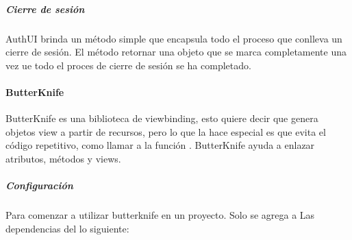 \subparagraph{Cierre de sesión}
\label{\detokenize{dev_docs:cierre-de-sesion}}
AuthUI brinda un método  simple que encapsula todo el proceso
que conlleva un cierre de sesión. El método retornar una objeto 
que se marca completamente una vez ue todo el proces de cierre de sesión
se ha completado.

%
\begin{sphinxVerbatim}[commandchars=\\\{\}]
  
              
                     
                      
                      
\end{sphinxVerbatim}


\paragraph{ButterKnife}
\label{\detokenize{dev_docs:butterknife}}
ButterKnife es una biblioteca de viewbinding, esto quiere decir que genera
objetos view a partir de recursos, pero lo que la hace especial es que evita
el código repetitivo, como llamar a la función . ButterKnife
ayuda a enlazar atributos, métodos y views.


\subparagraph{Configuración}
\label{\detokenize{dev_docs:id1}}
Para comenzar a utilizar butterknife en un proyecto. Solo se agrega a Las
dependencias del  lo siguiente:


